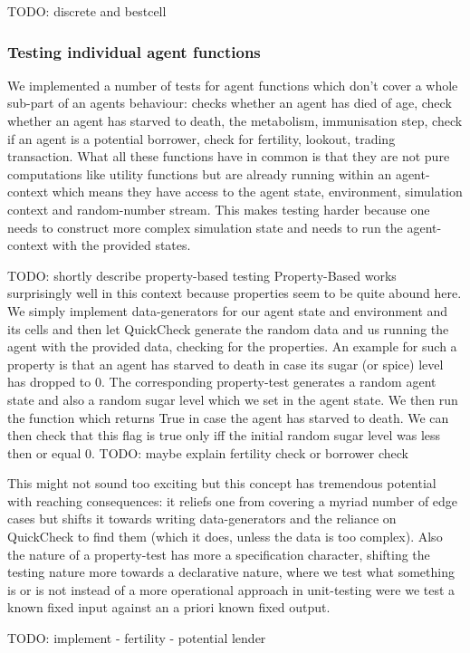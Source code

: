 TODO: discrete and bestcell

\subsubsection{Testing individual agent functions}
We implemented a number of tests for agent functions which don't cover a whole sub-part of an agents behaviour: checks whether an agent has died of age, check whether an agent has starved to death, the metabolism, immunisation step, check if an agent is a potential borrower, check for fertility, lookout, trading transaction. What all these functions have in common is that they are not pure computations like utility functions but are already running within an agent-context which means they have access to the agent state, environment, simulation context and random-number stream. This makes testing harder because one needs to construct more complex simulation state and needs to run the agent-context with the provided states.

TODO: shortly describe property-based testing
Property-Based works surprisingly well in this context because properties seem to be quite abound here. We simply implement data-generators for our agent state and environment and its cells and then let QuickCheck generate the random data and us running the agent with the provided data, checking for the properties. An example for such a property is that an agent has starved to death in case its sugar (or spice) level has dropped to 0. The corresponding property-test generates a random agent state and also a random sugar level which we set in the agent state. We then run the function which returns True in case the agent has starved to death. We can then check that this flag is true only iff the initial random sugar level was less then or equal 0. TODO: maybe explain fertility check or borrower check

This might not sound too exciting but this concept has tremendous potential with reaching consequences: it reliefs one from covering a myriad number of edge cases but shifts it towards writing data-generators and the reliance on QuickCheck to find them (which it does, unless the data is too complex). Also the nature of a property-test has more a specification character, shifting the testing nature more towards a declarative nature, where we test what something is or is not instead of a more operational approach in unit-testing were we test a known fixed input against an a priori known fixed output. 

TODO: implement
- fertility
- potential lender

